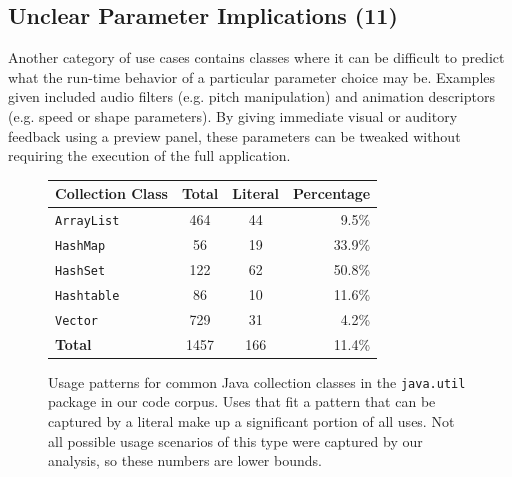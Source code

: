 \documentclass[10pt, conference, compsocconf]{IEEEtran}
\begin{document}
\subsection{Unclear Parameter Implications (11)}
Another category of use cases contains classes where it can be difficult to predict what the run-time behavior of a particular parameter choice may be. Examples given included audio filters (e.g. pitch manipulation) and animation descriptors (e.g. speed or shape parameters). By giving immediate visual or auditory feedback using a preview panel, these parameters can be tweaked without requiring the execution of the full application.


%
%	
%	
%	

\begin{figure}\label{collections}
\begin{center}
\begin{tabular}{l|c|c|r}
Collection Class& Total & Literal & Percentage \\
\hline
\texttt{ArrayList} & 464	&	44	&	9.5\% \\
\texttt{HashMap}	& 56 & 19 & 33.9\% \\
\texttt{HashSet} & 122 & 62 & 50.8\% \\
\texttt{Hashtable} & 86 & 10 & 11.6\% \\
\texttt{Vector} & 729 & 31 & 4.2\% \\
\hline
\textbf{Total} & 1457 & 166 & 11.4\% \\
\hline
\end{tabular}
\caption{Usage patterns for common Java collection classes in the \texttt{java.util} package in our code corpus. Uses that fit a pattern that can be captured by a literal make up a significant portion of all uses. Not all possible usage scenarios of this type were captured by our analysis, so these numbers are lower bounds.}
\end{center}
\end{figure}
\end{document}
